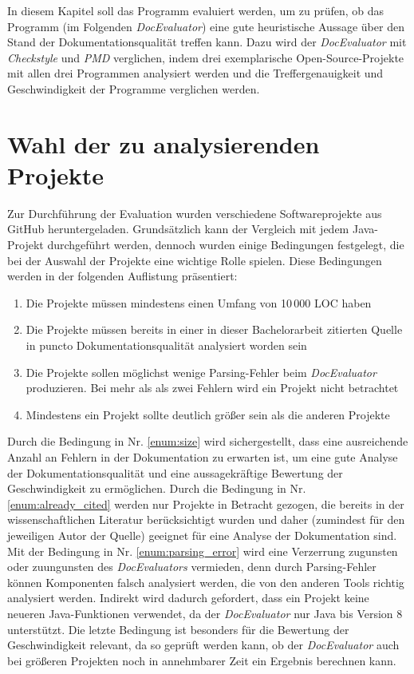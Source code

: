 \newcommand{\checkpmd}{\textit{Checkstyle} und \textit{PMD} }
\newcommand{\doceval}{\textit{DocEvaluator} }
In diesem Kapitel soll das Programm evaluiert werden, um zu prüfen, ob das Programm (im Folgenden \textit{DocEvaluator}) eine gute heuristische Aussage über den Stand der Dokumentationsqualität treffen kann. Dazu wird der \textit{DocEvaluator} mit \checkpmd{} verglichen, indem drei exemplarische Open-Source-Projekte mit allen drei Programmen analysiert werden und die Treffergenauigkeit und Geschwindigkeit der Programme verglichen werden. 

\section{Wahl der zu analysierenden Projekte}
Zur Durchführung der Evaluation wurden verschiedene Softwareprojekte aus GitHub heruntergeladen. Grundsätzlich kann der Vergleich mit jedem Java-Projekt durchgeführt werden, dennoch wurden einige Bedingungen festgelegt, die bei der Auswahl der Projekte eine wichtige Rolle spielen. Diese Bedingungen werden in der folgenden Auflistung präsentiert:

\begin{enumerate}
    \item \label{enum:size} Die Projekte müssen mindestens einen Umfang von 10\,000 \ac{LOC} haben
    \item \label{enum:already_cited} Die Projekte müssen bereits in einer in dieser Bachelorarbeit zitierten Quelle in puncto Dokumentationsqualität analysiert worden sein
    \item \label{enum:parsing_error}  Die Projekte sollen möglichst wenige Parsing-Fehler beim \doceval produzieren. Bei mehr als als zwei Fehlern wird ein Projekt nicht betrachtet
    \item Mindestens ein Projekt sollte deutlich größer sein als die anderen Projekte
\end{enumerate}
 Durch die Bedingung in Nr. \ref{enum:size} wird sichergestellt, dass eine ausreichende Anzahl an Fehlern in der Dokumentation zu erwarten ist, um eine gute Analyse der Dokumentationsqualität  und eine aussagekräftige Bewertung der Geschwindigkeit zu ermöglichen. Durch die Bedingung in Nr.  \ref{enum:already_cited} werden nur Projekte in Betracht gezogen, die bereits in der wissenschaftlichen Literatur berücksichtigt wurden und daher (zumindest für den jeweiligen Autor der Quelle) geeignet für eine Analyse der Dokumentation sind. Mit der Bedingung in Nr. \ref{enum:parsing_error} wird eine Verzerrung zugunsten oder zuungunsten des \textit{DocEvaluators} vermieden, denn durch Parsing-Fehler können Komponenten falsch analysiert werden, die von den anderen Tools richtig analysiert werden. Indirekt wird dadurch gefordert, dass ein Projekt keine neueren Java-Funktionen verwendet, da  der \textit{DocEvaluator} nur Java bis Version 8 unterstützt. Die letzte Bedingung ist besonders für die Bewertung der Geschwindigkeit relevant, da so geprüft werden kann, ob der \doceval auch bei größeren Projekten noch in annehmbarer Zeit ein Ergebnis berechnen kann. 
 
